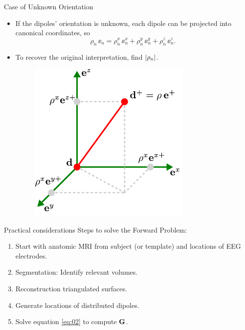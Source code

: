 \documentclass[progressbar=head]{beamer}
\begin{document}
\begin{frame}{Case of Unknown Orientation}
\begin{itemize}
\item If the dipoles' orientation is unknown, each dipole can be projected into canonical coordinates, so
\begin{equation}
\rho_n\, \ee_n =
\rho_n^x\, \ee_n^x + \rho_n^y\, \ee_n^y + \rho_n^z\, \ee_n^z.
\end{equation}
\item To recover the original interpretation, find $\left| {\rho_n} \right|$.
\begin{figure}
\centering
\includegraphics[width=0.4\linewidth]{./img/OrthDecomp}
\end{figure}
\end{itemize}
\end{frame}

\begin{frame}{Practical considerations}
Steps to solve the Forward Problem:
\begin{enumerate}
\item Start with anatomic MRI from subject (or template) and locations of EEG electrodes.
\item Segmentation: Identify relevant volumes.
\item Reconstruction triangulated surfaces.
\item Generate locations of distributed dipoles.
\item Solve equation \ref{eq:02} to compute $\mathbf{G}$.
\end{enumerate}

\end{frame}
\end{document}
